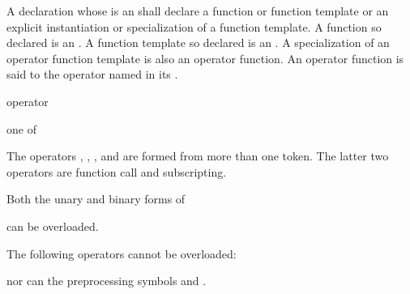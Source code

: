 \pnum
{}%
A declaration
whose  is an 
shall declare a function or function template or
an explicit instantiation or specialization of a function template.
A function so declared is an .
A function template so declared is
an .
A specialization of an operator function template is also an operator function.
An operator function is said to
the operator named in its
.

\begin{bnf}
\br
     operator
\end{bnf}

\begin{bnf}
 \textnormal{one of}\br
    \br
    \terminal{\~ \ \ \ \ \ \ \ ! \ \ \ \ \ \ \ + \ \ \ \ \ \ \ - \ \ \ \ \ \ \ * \ \ \ \ \ \ \ / \ \ \ \ \ \ \ \% \ \ \ \ \ \ \ \caret{} \ \ \ \ \ \ \ \&}\br
    \terminal{| \ \ \ \ \ \ \ = \ \ \ \ \ \ \ += \ \ \ \ \ \ -= \ \ \ \ \ \ *= \ \ \ \ \ \ /= \ \ \ \ \ \ \%= \ \ \ \ \ \ \caret{}= \ \ \ \ \ \ \&=}\br
    \terminal{|= \ \ \ \ \ \ == \ \ \ \ \ \ != \ \ \ \ \ \ < \ \ \ \ \ \ \ > \ \ \ \ \ \ \ <= \ \ \ \ \ \ >= \ \ \ \ \ \ <=> \ \ \ \ \ \&\&}\br
    \terminal{|| \ \ \ \ \ \ << \ \ \ \ \ \ >> \ \ \ \ \ \ <<= \ \ \ \ \ >>= \ \ \ \ \ ++ \ \ \ \ \ \ -- \ \ \ \ \ \ ,}
\end{bnf}
\begin{note}
The operators
,
,
\tcode{()},
and
\tcode{[]}
are formed from more than one token.
The latter two operators are function call
and subscripting.
\end{note}
%
%

\pnum
Both the unary and binary forms of
\begin{ncsimplebnf}
\terminal{+ \ \ \ \ \ - \ \ \ \ \ * \ \ \ \ \ \&}
\end{ncsimplebnf}
can be overloaded.

\pnum
\begin{note}
%
The following operators cannot be overloaded:
\begin{ncsimplebnf}
\end{ncsimplebnf}
nor can the preprocessing symbols
\tcode{\#}
and
\tcode{\#\#}.
\end{note}

